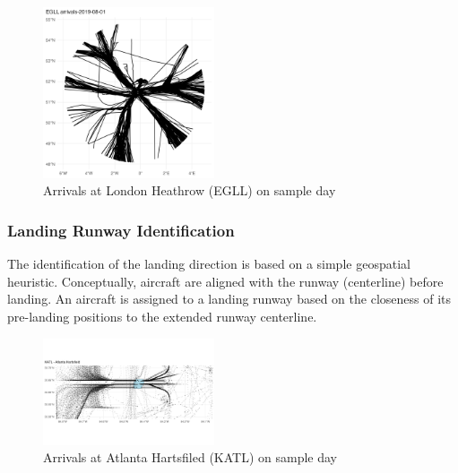 \documentclass[letterpaper, 10 pt, journal, twoside]{IEEEtran}
\begin{document}
\begin{figure}

{\centering \includegraphics[width=0.45\textwidth,height=\textheight]{./figures/EGLL-arrivals-single-day.png}

}

\caption{\label{fig-EGLL-arrivals}Arrivals at London Heathrow (EGLL) on
sample day}

\end{figure}

\hypertarget{landing-runway-identification}{%
\subsubsection{Landing Runway
Identification}\label{landing-runway-identification}}

The identification of the landing direction is based on a simple
geospatial heuristic. Conceptually, aircraft are aligned with the runway
(centerline) before landing. An aircraft is assigned to a landing runway
based on the closeness of its pre-landing positions to the extended
runway centerline.

\begin{figure}

{\centering \includegraphics[width=0.45\textwidth,height=\textheight]{./figures/KATL-traffic-single-day.png}

}

\caption{\label{fig-KATL-arrivals}Arrivals at Atlanta Hartsfiled (KATL)
on sample day}

\end{figure}
\end{document}
